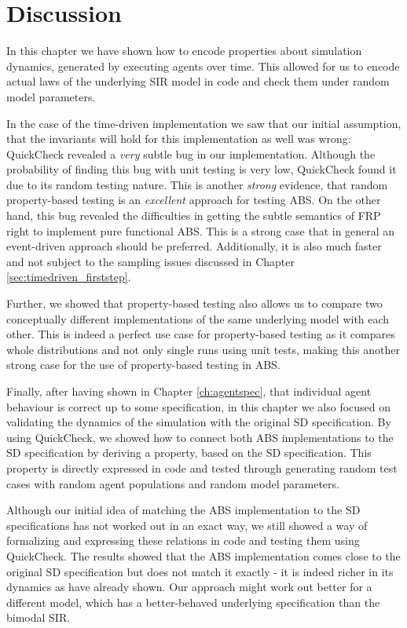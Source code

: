 \section{Discussion}
In this chapter we have shown how to encode properties about simulation dynamics, generated by executing agents over time. This allowed for us to encode actual laws of the underlying SIR model in code and check them under random model parameters.

In the case of the time-driven implementation we saw that our initial assumption, that the invariants will hold for this implementation as well was wrong: QuickCheck revealed a \textit{very} subtle bug in our implementation. Although the probability of finding this bug with unit testing is very low, QuickCheck found it due to its random testing nature. This is another \textit{strong} evidence, that random property-based testing is an \textit{excellent} approach for testing ABS. On the other hand, this bug revealed the difficulties in getting the subtle semantics of FRP right to implement pure functional ABS. This is a strong case that in general an event-driven approach should be preferred. Additionally, it is also much faster and not subject to the sampling issues discussed in Chapter \ref{sec:timedriven_firststep}.

Further, we showed that property-based testing also allows us to compare two conceptually different implementations of the same underlying model with each other. This is indeed a perfect use case for property-based testing as it compares whole distributions and not only single runs using unit tests, making this another strong case for the use of property-based testing in ABS.

Finally, after having shown in Chapter \ref{ch:agentspec}, that individual agent behaviour is correct up to some specification, in this chapter we also focused on validating the dynamics of the simulation with the original SD specification. By using QuickCheck, we showed how to connect both ABS implementations to the SD specification by deriving a property, based on the SD specification. This property is directly expressed in code and tested through generating random test cases with random agent populations and random model parameters. 

Although our initial idea of matching the ABS implementation to the SD specifications has not worked out in an exact way, we still showed a way of formalizing and expressing these relations in code and testing them using \\ QuickCheck. The results showed that the ABS implementation comes close to the original SD specification but does not match it exactly - it is indeed richer in its dynamics as \cite{figueredo_comparing_2014,macal_agent-based_2010} have already shown. Our approach might work out better for a different model, which has a better-behaved underlying specification than the bimodal SIR.

